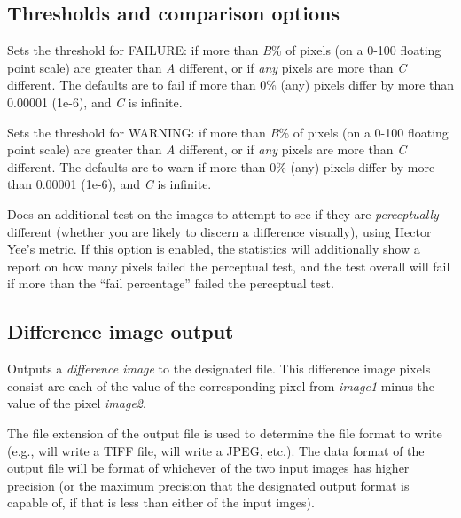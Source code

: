 \subsection*{Thresholds and comparison options}


Sets the threshold for {\cf FAILURE}: if more than \emph{B}\% of pixels
(on a 0-100 floating point scale) are greater than \emph{A} different,
or if \emph{any} pixels are more than \emph{C} different.  The defaults
are to fail if more than 0\% (any) pixels differ by more than 0.00001
(1e-6), and \emph{C} is infinite.
\apiend


Sets the threshold for {\cf WARNING}: if more than \emph{B}\% of pixels
(on a 0-100 floating point scale) are greater than \emph{A} different,
or if \emph{any} pixels are more than \emph{C} different.  The defaults
are to warn if more than 0\% (any) pixels differ by more than 0.00001
(1e-6), and \emph{C} is infinite.
\apiend

Does an additional test on the images to attempt to see if they are
\emph{perceptually} different (whether you are likely to discern
a difference visually), using Hector Yee's metric.  If this option
is enabled, the statistics will additionally show a report on how
many pixels failed the perceptual test, and the test overall will
fail if more than the ``fail percentage'' failed the perceptual test.
\apiend

\subsection*{Difference image output}

Outputs a \emph{difference image} to the designated file.
This difference image pixels consist are each of the value of the
corresponding pixel from \emph{image1} minus the value of the
pixel \emph{image2}.  

The file extension of the output file is used to determine the file
format to write (e.g.,  will write a TIFF file,
 will write a JPEG, etc.).  The data format of the output
file will be format of whichever of the two input images has higher
precision (or the maximum precision that the designated output format is
capable of, if that is less than either of the input imges).

